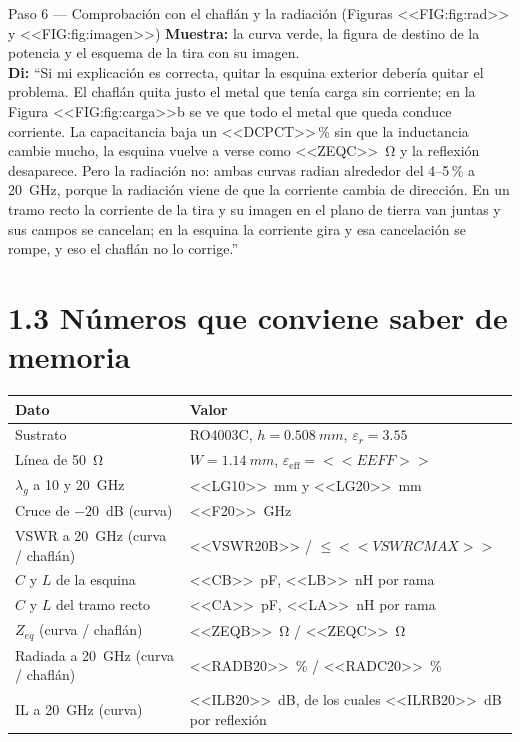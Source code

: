 \documentclass[11pt,letterpaper]{article}
\begin{document}
\begin{paso}{Paso 6 --- Comprobación con el chaflán y la radiación (Figuras <<FIG:fig:rad>> y <<FIG:fig:imagen>>)}
\textbf{Muestra:} la curva verde, la figura de destino de la potencia y el esquema de la tira con su imagen.\\
\textbf{Di:} ``Si mi explicación es correcta, quitar la esquina exterior debería quitar el problema. El chaflán quita justo el metal que tenía carga sin corriente; en la Figura <<FIG:fig:carga>>b se ve que todo el metal que queda conduce corriente. La capacitancia baja un <<DCPCT>>\,\% sin que la inductancia cambie mucho, la esquina vuelve a verse como \SI{<<ZEQC>>}{\ohm} y la reflexión desaparece. Pero la radiación no: ambas curvas radian alrededor del 4--5\,\% a \SI{20}{GHz}, porque la radiación viene de que la corriente cambia de dirección. En un tramo recto la corriente de la tira y su imagen en el plano de tierra van juntas y sus campos se cancelan; en la esquina la corriente gira y esa cancelación se rompe, y eso el chaflán no lo corrige.''
\end{paso}

\section*{1.3 Números que conviene saber de memoria}
\begin{center}
\small
\begin{tabular}{ll}
\toprule
Dato & Valor \\
\midrule
Sustrato & RO4003C, $h=\SI{0.508}{mm}$, $\varepsilon_r=3.55$ \\
Línea de \SI{50}{\ohm} & $W=\SI{1.14}{mm}$, $\varepsilon_{\mathrm{eff}}=<<EEFF>>$ \\
$\lambda_g$ a 10 y \SI{20}{GHz} & \SI{<<LG10>>}{mm} y \SI{<<LG20>>}{mm} \\
Cruce de $-20$~dB (curva) & \SI{<<F20>>}{GHz} \\
VSWR a \SI{20}{GHz} (curva / chaflán) & <<VSWR20B>> / $\leq <<VSWRCMAX>>$ \\
$C$ y $L$ de la esquina & \SI{<<CB>>}{pF}, \SI{<<LB>>}{nH} por rama \\
$C$ y $L$ del tramo recto & \SI{<<CA>>}{pF}, \SI{<<LA>>}{nH} por rama \\
$Z_{eq}$ (curva / chaflán) & \SI{<<ZEQB>>}{\ohm} / \SI{<<ZEQC>>}{\ohm} \\
Radiada a \SI{20}{GHz} (curva / chaflán) & \SI{<<RADB20>>}{\percent} / \SI{<<RADC20>>}{\percent} \\
IL a \SI{20}{GHz} (curva) & \SI{<<ILB20>>}{dB}, de los cuales \SI{<<ILRB20>>}{dB} por reflexión \\
\bottomrule
\end{tabular}
\end{center}
\end{document}
